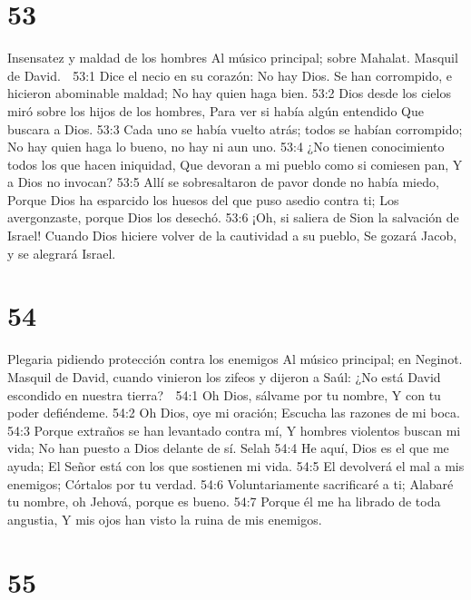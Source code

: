 \chapter{53}

Insensatez y maldad de los hombres 
Al músico principal; sobre Mahalat. Masquil de David. 

53:1 Dice el necio en su corazón: No hay Dios. 
Se han corrompido, e hicieron abominable maldad; 
No hay quien haga bien. 
53:2 Dios desde los cielos miró sobre los hijos de los hombres, 
Para ver si había algún entendido 
Que buscara a Dios. 
53:3 Cada uno se había vuelto atrás; todos se habían corrompido; 
No hay quien haga lo bueno, no hay ni aun uno. 
53:4 ¿No tienen conocimiento todos los que hacen iniquidad, 
Que devoran a mi pueblo como si comiesen pan, 
Y a Dios no invocan? 
53:5 Allí se sobresaltaron de pavor donde no había miedo, 
Porque Dios ha esparcido los huesos del que puso asedio contra ti; 
Los avergonzaste, porque Dios los desechó. 
53:6 ¡Oh, si saliera de Sion la salvación de Israel! 
Cuando Dios hiciere volver de la cautividad a su pueblo, 
Se gozará Jacob, y se alegrará Israel. 

\chapter{54}

Plegaria pidiendo protección contra los enemigos 
Al músico principal; en Neginot. Masquil de David, cuando vinieron los zifeos y dijeron a Saúl: ¿No está David escondido en nuestra tierra? 

54:1 Oh Dios, sálvame por tu nombre, 
Y con tu poder defiéndeme. 
54:2 Oh Dios, oye mi oración; 
Escucha las razones de mi boca. 
54:3 Porque extraños se han levantado contra mí, 
Y hombres violentos buscan mi vida; 
No han puesto a Dios delante de sí. Selah 
54:4 He aquí, Dios es el que me ayuda; 
El Señor está con los que sostienen mi vida. 
54:5 El devolverá el mal a mis enemigos; 
Córtalos por tu verdad. 
54:6 Voluntariamente sacrificaré a ti; 
Alabaré tu nombre, oh Jehová, porque es bueno. 
54:7 Porque él me ha librado de toda angustia, 
Y mis ojos han visto la ruina de mis enemigos. 

\chapter{55}

